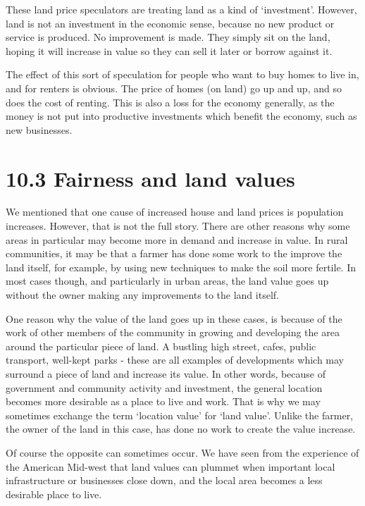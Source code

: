 \documentclass[]{tufte-handout}
\begin{document}
These land price speculators are treating land as a kind of
`investment'. However, land is not an investment in the economic sense,
because no new product or service is produced. No improvement is made.
They simply sit on the land, hoping it will increase in value so they
can sell it later or borrow against it.

The effect of this sort of speculation for people who want to buy homes
to live in, and for renters is obvious. The price of homes (on land) go
up and up, and so does the cost of renting. This is also a loss for the
economy generally, as the money is not put into productive investments
which benefit the economy, such as new businesses.

\hypertarget{fairness-and-land-values}{%
\section{10.3 Fairness and land values}\label{fairness-and-land-values}}

We mentioned that one cause of increased house and land prices is
population increases. However, that is not the full story. There are
other reasons why some areas in particular may become more in demand and
increase in value. In rural communities, it may be that a farmer has
done some work to the improve the land itself, for example, by using new
techniques to make the soil more fertile. In most cases though, and
particularly in urban areas, the land value goes up without the owner
making any improvements to the land itself.

One reason why the value of the land goes up in these cases, is because
of the work of other members of the community in growing and developing
the area around the particular piece of land. A bustling high street,
cafes, public transport, well-kept parks - these are all examples of
developments which may surround a piece of land and increase its value.
In other words, because of government and community activity and
investment, the general location becomes more desirable as a place to
live and work. That is why we may sometimes exchange the term `location
value' for `land value'. Unlike the farmer, the owner of the land in
this case, has done no work to create the value increase.

Of course the opposite can sometimes occur. We have seen from the
experience of the American Mid-west that land values can plummet when
important local infrastructure or businesses close down, and the local
area becomes a less desirable place to live.
\end{document}
